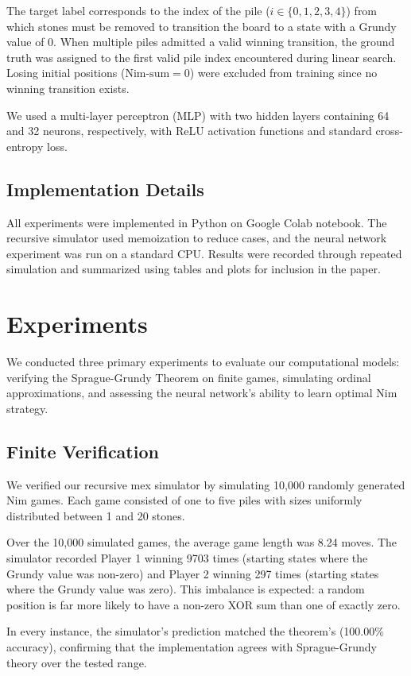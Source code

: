 \documentclass[11pt]{article}
\begin{document}
The target label corresponds to the index of the pile ($i \in \{0,1,2,3,4\}$) from which stones must be removed to transition the board to a state with a Grundy value of 0. When multiple piles admitted a valid winning transition, the ground truth was assigned to the first valid pile index encountered during linear search. Losing initial positions ($\text{Nim-sum}=0$) were excluded from training since no winning transition exists.

We used a multi-layer perceptron (MLP) with two hidden layers containing 64 and 32 neurons, respectively, with ReLU activation functions and standard cross-entropy loss.

\subsection{Implementation Details}
All experiments were implemented in Python on Google Colab notebook. The recursive simulator used memoization to reduce cases, and the neural network experiment was run on a standard CPU. Results were recorded through repeated simulation and summarized using tables and plots for inclusion in the paper.

\section{Experiments}
We conducted three primary experiments to evaluate our computational models: verifying the Sprague-Grundy Theorem on finite games, simulating ordinal approximations, and assessing the neural network's ability to learn optimal Nim strategy. 
\subsection{Finite Verification}
We verified our recursive mex simulator by simulating 10,000 randomly generated Nim games. Each game consisted of one to five piles with sizes uniformly distributed between 1 and 20 stones. 

Over the 10,000 simulated games, the average game length was 8.24 moves. The simulator recorded Player 1 winning 9703 times (starting states where the Grundy value was non-zero) and Player 2 winning 297 times (starting states where the Grundy value was zero). This imbalance is expected: a random position is far more likely to have a non-zero XOR sum than one of exactly zero.

In every instance, the simulator's prediction matched the theorem's (100.00\% accuracy), confirming that the implementation agrees with Sprague-Grundy theory over the tested range.
\end{document}
